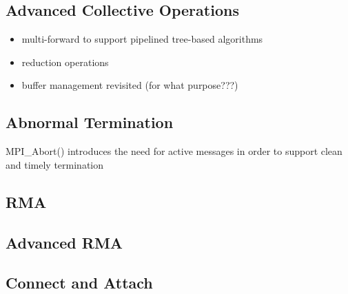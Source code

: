 
\subsection{Advanced Collective Operations}

\begin{itemize}
\item multi-forward to support pipelined tree-based algorithms
\item reduction operations
\item buffer management revisited (for what purpose???)
\end{itemize}


\subsection{Abnormal Termination}

MPI_Abort() introduces the need for active messages in order to support clean
and timely termination


\subsection{RMA}


\subsection{Advanced RMA}


\subsection{Connect and Attach}

